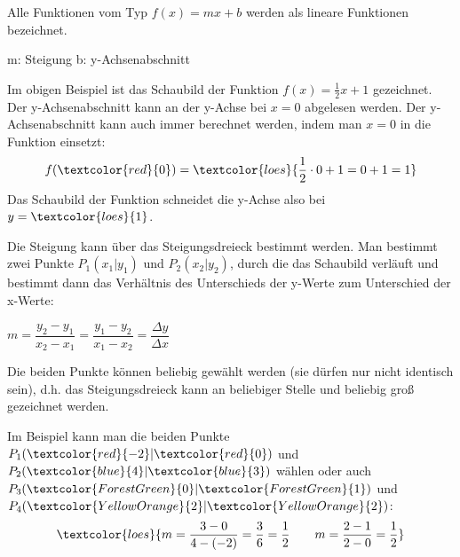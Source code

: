 
Alle Funktionen vom Typ $f(x)=mx+b$ werden als lineare Funktionen bezeichnet.
\begin{tcolorbox}
	\centering\textcolor{loestc}{m: Steigung \qquad	b: y-Achsenabschnitt}
\end{tcolorbox}
%

\medskip

Im obigen Beispiel ist das Schaubild der Funktion $f(x)=\frac{1}{2}x+1$ gezeichnet. Der y-Achsenabschnitt kann an der y-Achse bei $x=0$ abgelesen werden. Der y-Achsenabschnitt kann auch immer berechnet werden, indem man $x=0$ in die Funktion einsetzt:
\begin{align*}
	f(\textcolor{red}{0})=\textcolor{loes}{\frac{1}{2}\cdot 0+1=0+1=1}
\end{align*}
Das Schaubild der Funktion schneidet die y-Achse also bei $y=\textcolor{loes}{1}$\textcolor{loes}{.}

Die Steigung kann über das Steigungsdreieck bestimmt werden. Man bestimmt zwei Punkte $P_1(x_1|y_1)$ und $P_2(x_2|y_2)$, durch die das Schaubild verläuft und bestimmt dann das Verhältnis des Unterschieds der y-Werte zum Unterschied der x-Werte:
\begin{tcolorbox}
	\centering\textcolor{loestc}{$m=\dfrac{y_2-y_1}{x_2-x_1}=\dfrac{y_1-y_2}{x_1-x_2}=\dfrac{\Delta y}{\Delta x}$}
\end{tcolorbox}
Die beiden Punkte können beliebig gewählt werden (sie dürfen nur nicht identisch sein), d.h. das Steigungsdreieck kann an beliebiger Stelle und beliebig groß gezeichnet werden.

Im Beispiel kann man die beiden Punkte $P_1(\textcolor{red}{-2}|\textcolor{red}{0})$ und $P_2(\textcolor{blue}{4}|\textcolor{blue}{3})$ wählen oder auch $P_3(\textcolor{ForestGreen}{0}|\textcolor{ForestGreen}{1})$ und $P_4(\textcolor{YellowOrange}{2}|\textcolor{YellowOrange}{2})$:
\begin{align*}
	\textcolor{loes}{m=\dfrac{3-0}{4-(-2)}=\dfrac{3}{6}=\dfrac{1}{2}
	\qquad
	m=\dfrac{2-1}{2-0}=\dfrac{1}{2}}
\end{align*}

